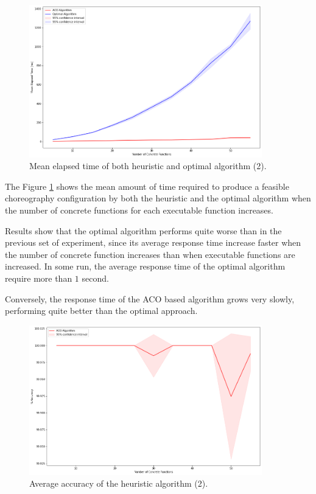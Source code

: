 \documentclass[12pt,a4paper]{report}
\begin{document}
\begin{figure}[h]
	\centering
	\includegraphics[width=0.9\textwidth]{./experiments/ACOvsOptimalIncreasingConcrete.png}
	\caption{Mean elapsed time of both heuristic and optimal algorithm (2).}%
	\label{ACOvsOptimalIncreasingConcrete}
\end{figure}

The Figure \ref{ACOvsOptimalIncreasingConcrete} shows the mean amount of time required to produce a feasible choreography configuration by both the heuristic and the optimal algorithm when the number of concrete functions for each executable function increases. 

Results show that the optimal algorithm performs quite worse than in the previous set of experiment, since its average response time increase faster when the number of concrete function increases than when executable functions are increased. In some run, the average response time of the optimal algorithm require more than $1$ second. 

Conversely, the response time of the ACO based algorithm grows very slowly, performing quite better than the optimal approach.

\begin{figure}[h]
	\centering
	\includegraphics[width=0.9\textwidth]{./experiments/ACOvsOptimalAccuracyIncreasingConcrete.png}
	\caption{Average accuracy of the heuristic algorithm (2).}%
	\label{ACOvsOptimalAccuracyIncreasingConcrete}
\end{figure}
\end{document}
